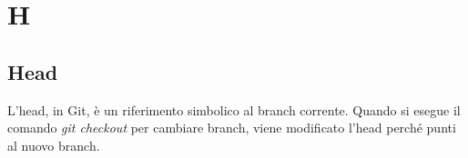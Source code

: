 \section{H}

    \subsection*{Head}

        L'head, in Git, è un riferimento simbolico al branch corrente. Quando si esegue il comando \textit{git checkout}
        per cambiare branch, viene modificato l'head perché punti al nuovo branch.      
        